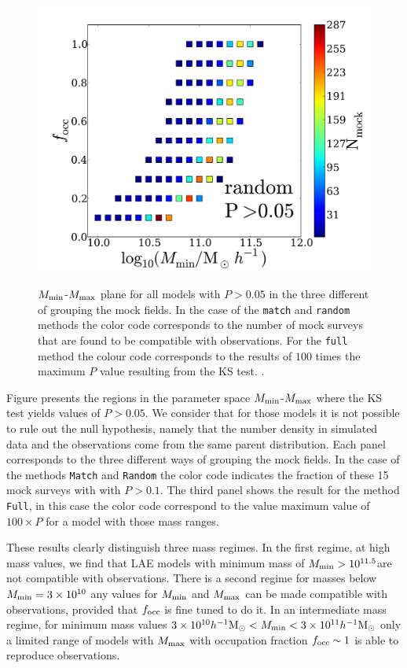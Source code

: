 \documentclass[usenatbib]{mn2e}
\newcommand{\hMsun}{{\ifmmode{h^{-1}{\rm {M_{\odot}}}}\else{$h^{-1}{\rm{M_{\odot}}}$}\fi}}
\begin{document}
\begin{figure}
\begin{center}
\hspace{5mm}
\includegraphics[width=0.49\linewidth,angle=0]{./plots/Fig3_random_P5.pdf}\\
\end{center} 
\caption{$M_{\rm min}$-$M_{\rm max}$ plane for all models with
  $P>0.05$ in the three different of grouping the mock fields. In the
  case of the {\tt match} and {\tt random} methods the  color code
  corresponds to the number of mock surveys that are found to
  be compatible with observations. For the {\tt full} method the
  colour code corresponds to the results of $100$ times the maximum $P$ value
  resulting from the KS test. \label{figure:landscape}.}  
\end{figure}


Figure \label{figure:landscape} presents the regions in the parameter
space $M_{\rm min}$-$M_{\rm max}$ where the KS test yields values of
$P>0.05$. We consider that for those models it is not possible to rule out the null
hypothesis, namely that the number density in simulated data and the observations come
from the same parent distribution. Each panel corresponds to the three different ways of
grouping the mock fields. In the case of the methods {\tt{Match}}
and {\tt{Random}} the color code indicates the fraction of these 15
mock surveys with with $P>0.1$. The third panel shows the result for
the method {\tt{Full}}, in this case the color code correspond
to the value maximum value of $100\times P$ for a model with those
mass ranges.

These results clearly distinguish three mass regimes. In the first regime, at
high mass values, we find that LAE models with minimum mass of $M_{\rm
  min}>10^{11.5}$\hMsun are not compatible with observations. There is
a second regime for masses below $M_{\rm
  min}=3\times 10^{10}$ any values for $M_{\rm min}$ and $M_{\rm max}$
can be made compatible with observations, provided that
$f_{\rm occ}$ is fine tuned to do it. In an intermediate mass regime,
for minimum mass values $3\times 10^{10}\hMsun < M_{\rm min}< 3\times 10^{11}\hMsun$ only a
limited range of models with $M_{\rm max}$ with occupation fraction
$f_{\rm occ}\sim 1$ is able to reproduce observations. 
\end{document}
